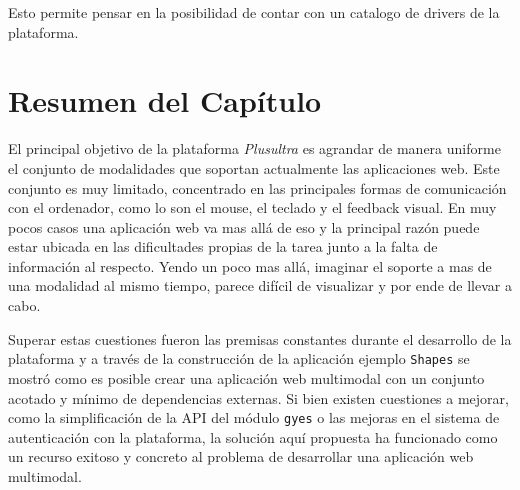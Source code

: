 Esto permite pensar en la posibilidad de contar con un catalogo de drivers de la plataforma.

\section{Resumen del Capítulo}
El principal objetivo de la plataforma \emph{Plusultra} es agrandar de manera uniforme el conjunto de modalidades que soportan actualmente las aplicaciones web. Este conjunto  es muy limitado, concentrado en las principales formas de comunicación con el ordenador, como lo son el mouse, el teclado y el feedback visual. En muy pocos casos una aplicación web va mas allá de eso y la principal razón puede estar ubicada en las dificultades propias de la tarea junto a la falta de información al respecto. Yendo un poco mas allá, imaginar el soporte a mas de una modalidad al mismo tiempo, parece difícil de visualizar y por ende de llevar a cabo.

Superar estas cuestiones fueron las premisas constantes durante el desarrollo de la plataforma y a través de la construcción de la aplicación ejemplo \texttt{Shapes} se mostró como es posible crear una aplicación web multimodal con un conjunto acotado y mínimo de  dependencias externas. Si bien existen cuestiones a mejorar, como la simplificación de la API del módulo \texttt{gyes} o las mejoras en el sistema de autenticación con la plataforma, la solución aquí propuesta ha funcionado como un recurso exitoso y concreto al problema de desarrollar una aplicación web multimodal.